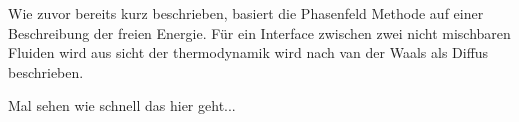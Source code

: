Wie zuvor bereits kurz beschrieben, basiert die Phasenfeld Methode auf einer Beschreibung der freien Energie. Für ein Interface zwischen zwei nicht mischbaren Fluiden wird aus sicht der thermodynamik wird nach van der Waals \cite{vanderwaals1979ThermodynamicTheoryCapillarity} als Diffus beschrieben.

Mal sehen wie schnell das hier geht...